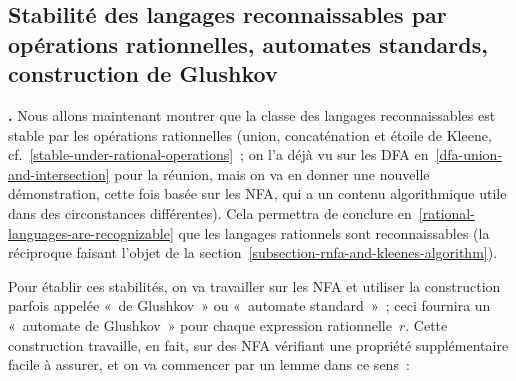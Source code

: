 \documentclass[12pt,a4paper]{article}
\theoremstyle{definition}
\newcommand\thingy{%
\refstepcounter{comcnt}\medskip\noindent\textbf{\thecomcnt.} }
\begin{document}
\subsection{Stabilité des langages reconnaissables par opérations rationnelles, automates standards, construction de Glushkov}\label{subsection-recognizable-languages-under-rational-operations}

\thingy Nous allons maintenant montrer que la classe des langages
reconnaissables est stable par les opérations rationnelles (union,
concaténation et étoile de Kleene,
cf. \ref{stable-under-rational-operations} ; on l'a déjà vu sur les
DFA en \ref{dfa-union-and-intersection} pour la réunion, mais on va en
donner une nouvelle démonstration, cette fois basée sur les NFA, qui a
un contenu algorithmique utile dans des circonstances différentes).
Cela permettra de conclure
en \ref{rational-languages-are-recognizable} que les langages
rationnels sont reconnaissables (la réciproque faisant l'objet de la
section \ref{subsection-rnfa-and-kleenes-algorithm}).

\smallskip

Pour établir ces stabilités, on va travailler sur les NFA et utiliser
la construction parfois appelée « de Glushkov » ou « automate
standard » ; ceci fournira un « automate de Glushkov » pour chaque
expression rationnelle $r$.  Cette construction travaille, en fait,
sur des NFA vérifiant une propriété supplémentaire facile à assurer,
et on va commencer par un lemme dans ce sens :
\end{document}
